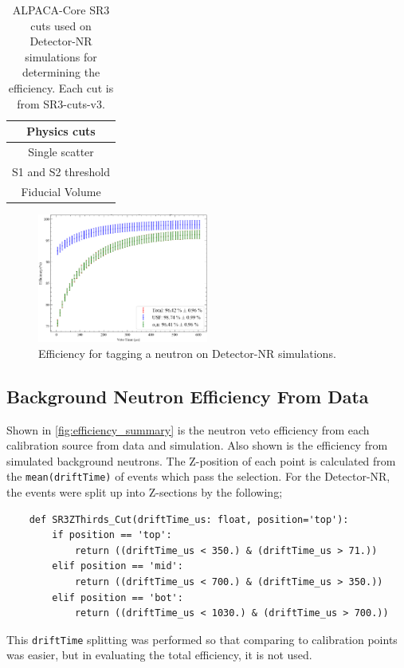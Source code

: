 \begin{table}
    \centering
    \begin{tabular}{c}
     Physics cuts  \\
     \hline
     Single scatter \\
     S1 and S2 threshold \\
     Fiducial Volume 
    \end{tabular}
    \caption{ALPACA-Core SR3 cuts used on Detector-NR simulations for determining the efficiency. Each cut is from SR3-cuts-v3.
    }
    \label{tab:detector_nr_simulation_efficiency_cuts}
\end{table}


\begin{figure}
    \centering
    \includegraphics[width=0.5\textwidth]{figures/VetoEfficiency/det_nr_efficiency.png}
    \caption{Efficiency for tagging a neutron on Detector-NR simulations.}
    \label{fig:detector_nr_efficiency}
\end{figure}

\clearpage
\subsection{Background Neutron Efficiency From Data}
Shown in \autoref{fig:efficiency_summary} is the neutron veto efficiency from each calibration source from data and simulation.
Also shown is the efficiency from simulated background neutrons.
The Z-position of each point is calculated from the \lstinline{mean(driftTime)} of events which pass the selection.
For the Detector-NR, the events were split up into Z-sections by the following;
\begin{lstlisting}
    def SR3ZThirds_Cut(driftTime_us: float, position='top'):
        if position == 'top':
            return ((driftTime_us < 350.) & (driftTime_us > 71.))
        elif position == 'mid':
            return ((driftTime_us < 700.) & (driftTime_us > 350.))
        elif position == 'bot':
            return ((driftTime_us < 1030.) & (driftTime_us > 700.))
\end{lstlisting}
This \lstinline{driftTime} splitting was performed so that comparing to calibration points was easier, but in evaluating the total efficiency, it is not used.

